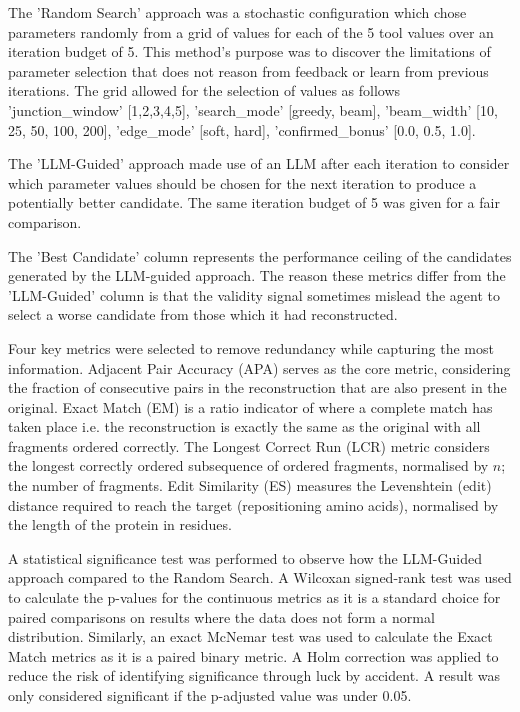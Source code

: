 \documentclass[journal]{IEEEtran}
\begin{document}
The 'Random Search' approach was a stochastic configuration which chose parameters randomly from a grid of values
for each of the 5 tool values over an iteration budget of 5. This method's purpose was to discover
the limitations of parameter selection that does not reason from feedback or learn from previous
iterations. The grid allowed for the selection of values as
follows 'junction\_window' [1,2,3,4,5], 'search\_mode' [greedy, beam],
'beam\_width' [10, 25, 50, 100, 200], 'edge\_mode' [soft, hard], 'confirmed\_bonus' [0.0, 0.5, 1.0].

The 'LLM-Guided' approach made use of an LLM after each iteration to consider which parameter values should be chosen
for the next iteration to produce a potentially better candidate. The same iteration budget of 5 was given
for a fair comparison.

The 'Best Candidate' column represents the performance ceiling of the candidates generated by the
LLM-guided approach. The reason these metrics differ from the 'LLM-Guided' column is that the validity
signal sometimes mislead the agent to select a worse candidate from those which it had reconstructed.

Four key metrics were selected to remove redundancy while capturing the most information.
Adjacent Pair Accuracy (APA) serves as the core metric, considering the fraction of consecutive pairs in the reconstruction
that are also present in the original.
Exact Match (EM) is a ratio indicator of where a complete match has taken place i.e. the reconstruction is
exactly the same as the original with all fragments ordered correctly.
The Longest Correct Run (LCR) metric considers the longest correctly ordered subsequence of ordered fragments, normalised by $n$; the number of fragments.
Edit Similarity (ES) measures the Levenshtein (edit) distance required to reach the target (repositioning amino acids), normalised by the length of the protein in residues.

A statistical significance test was performed to observe how the LLM-Guided approach compared to the Random Search.
A Wilcoxan signed-rank test was used to calculate the p-values for the continuous metrics as it is a standard choice for paired comparisons on results
where the data does not form a normal distribution. Similarly, an exact McNemar test was used to calculate the Exact Match metrics as it is a paired binary metric. A Holm correction was applied to reduce the risk of identifying
significance through luck by accident. A result was only considered significant if the p-adjusted value was under 0.05.
\end{document}
